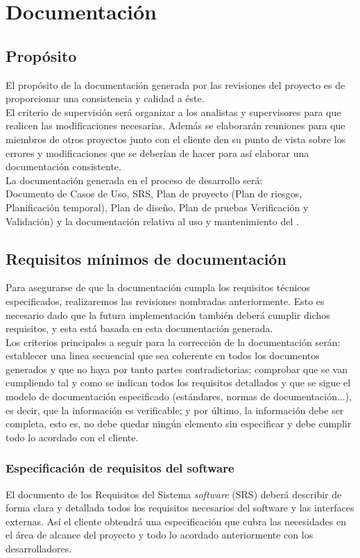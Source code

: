\documentclass[11pt, a4paper, twoside, titlepage]{article}
\begin{document}
	\section{Documentación} %
		\subsection{Propósito} 
			El propósito de la documentación generada por las revisiones del proyecto es de proporcionar una consistencia y calidad a éste.\\
			El criterio de supervisión será organizar a los analistas y supervisores para que realicen las modificaciones necesarias. Además se elaborarán reuniones para que miembros de otros proyectos junto con el cliente den su punto de vista sobre los errores y modificaciones que se deberían de hacer para así elaborar una documentación consistente.\\

			La documentación generada en el proceso de desarrollo será: \\
			Documento de Casos de Uso, SRS, Plan de proyecto (Plan de riesgos, Planificación temporal), Plan de diseño, Plan de pruebas Verificación y Validación) y la documentación relativa al uso y mantenimiento del \software.
			
		\subsection{Requisitos mínimos de documentación}
			Para asegurarse de que la documentación cumpla los requisitos técnicos especificados, realizaremos las revisiones nombradas
anteriormente. Esto es necesario dado que la futura implementación también deberá cumplir dichos requisitos, y esta está basada en esta documentación generada.\\

			Los criterios principales a seguir para la corrección de la documentación serán: establecer una linea secuencial que sea
coherente en todos los documentos generados y que no haya por tanto partes contradictorias; comprobar que se van cumpliendo tal y como se indican todos los requisitos detallados y que se sigue el modelo de documentación especificado (estándares, normas de documentación...), es decir, que la información es verificable; y por último, la información debe ser completa, esto es, no debe quedar ningún elemento sin especificar y debe cumplir todo lo acordado con el cliente.
			
				\subsubsection{Especificación de requisitos del software}
					El documento de los Requisitos del Sistema {\itshape software} (SRS) deberá describir de forma clara y detallada todos los requisitos necesarios del software y las interfaces externas. Así el cliente obtendrá una especificación que cubra las necesidades en el área de alcance del proyecto y todo lo acordado anteriormente con los desarrolladores.
		
\end{document}
